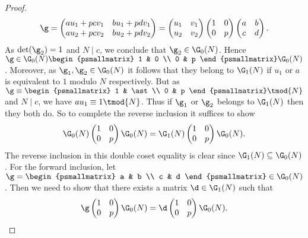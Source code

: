 \begin{proof}
      \[
        \g = \begin{pmatrix} au_{1}+pcv_{1} & bu_{1}+pdv_{1} \\ au_{2}+pcv_{2} & bu_{2}+pdv_{2} \end{pmatrix} = \begin{pmatrix} u_{1} & v_{1} \\ u_{2} & v_{2}\end{pmatrix}\begin{pmatrix} 1 & 0 \\ 0 & p\end{pmatrix}\begin{pmatrix} a & b \\ c & d\end{pmatrix}.
      \]
      As $\det(\g_{2}) = 1$ and $N \mid c$, we conclude that $\g_{2} \in \G_{0}(N)$. Hence $\g \in \G_{0}(N)\begin{psmallmatrix} 1 & 0 \\ 0 & p \end{psmallmatrix}\G_{0}(N)$. Moreover, as $\g_{1},\g_{2} \in \G_{0}(N)$ it follows that they belong to $\G_{1}(N)$ if $u_{1}$ or $a$ is equivalent to $1$ modulo $N$ respectively. But as $\g \equiv \begin{psmallmatrix} 1 & \ast \\ 0 & p \end{psmallmatrix} \tmod{N}$ and $N \mid c$, we have $au_{1} \equiv 1 \tmod{N}$. Thus if $\g_{1}$ or $\g_{2}$ belongs to $\G_{1}(N)$ then they both do. So to complete the reverse inclusion it suffices to show
      \[
        \G_{0}(N)\begin{pmatrix} 1 & 0 \\ 0 & p \end{pmatrix}\G_{0}(N) = \G_{1}(N)\begin{pmatrix} 1 & 0 \\ 0 & p \end{pmatrix}\G_{0}(N).
      \]
      The reverse inclusion in this double coset equality is clear since $\G_{1}(N) \subseteq \G_{0}(N)$. For the forward inclusion, let $\g = \begin{psmallmatrix} a & b \\ c & d \end{psmallmatrix} \in \G_{0}(N)$. Then we need to show that there exists a matrix $\d \in \G_{1}(N)$ such that
      \[
        \g\begin{pmatrix} 1 & 0 \\ 0 & p \end{pmatrix}\G_{0}(N) = \d\begin{pmatrix} 1 & 0 \\ 0 & p \end{pmatrix}\G_{0}(N).
\]
\end{proof}
